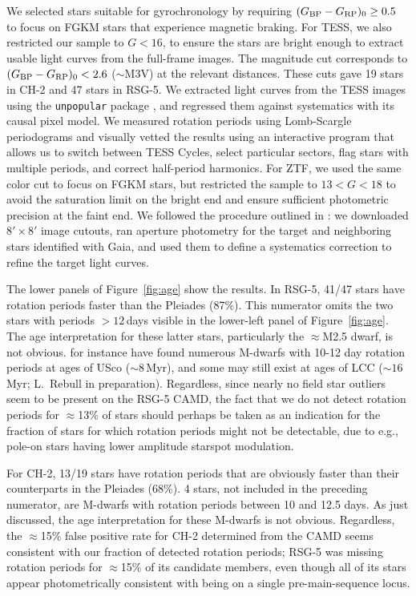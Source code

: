 \documentclass[12pt,twocolumn]{aastex63}
\newcommand{\bpmrpo}{(G_{\rm BP}-G_{\rm RP})_0}
\begin{document}
We selected stars suitable for gyrochronology by requiring $\bpmrpo
\geq 0.5$ to focus on FGKM stars that experience magnetic braking.
For TESS, we also restricted our sample to $G<16$, to ensure the stars
are bright enough to extract usable light curves from the full-frame
images.  The magnitude cut corresponds to $\bpmrpo < 2.6$
($\sim$M3V) at the relevant distances.  These cuts gave 19 stars in
CH-2 and 47 stars in RSG-5.  We extracted light curves from the TESS
images using the \texttt{unpopular} package \citep{hattorio_2021_cpm},
and regressed them against systematics with its causal pixel model.
We measured rotation periods using Lomb-Scargle periodograms and
visually vetted the results using an interactive program that allows
us to switch between TESS Cycles, select particular sectors, flag
stars with multiple periods, and correct half-period harmonics. For
ZTF, we used the same color cut to focus on FGKM stars, but restricted
the sample to $13 < G < 18$ to avoid the saturation limit on the
bright end and ensure sufficient photometric precision at the faint
end. We followed the procedure outlined in \citet{curtis_rup147_2020}:
we downloaded $8'\times8'$ image cutouts, ran aperture photometry for
the target and neighboring stars identified with Gaia, and used them
to define a systematics correction to refine the target light curves. 

The lower panels of Figure~\ref{fig:age} show the results.  In RSG-5,
41/47 stars have rotation periods faster than the Pleiades (87\%).
This numerator omits the two stars with periods $>$$12$\,days visible
in the lower-left panel of Figure~\ref{fig:age}.  The age
interpretation for these latter stars, particularly the $\approx$M2.5
dwarf, is not obvious.  \citet{rebull_usco_2018} for instance have
found numerous M-dwarfs with 10-12 day rotation periods at ages of
USco ($\sim$$8$\,Myr), and some may still exist at ages of LCC
($\sim$$16$\,Myr; L.~Rebull in preparation).  Regardless, since
nearly no field star outliers seem to be present on the RSG-5 CAMD,
the fact that we do not detect rotation periods for $\approx$13\% of
stars should perhaps be taken as an indication for the fraction of
stars for which rotation periods might not be detectable, due to
{e.g.}, pole-on stars having lower amplitude starspot modulation.

For CH-2, 13/19 stars have rotation periods that are obviously faster
than their counterparts in the Pleiades (68\%).  4 stars, not included
in the preceding numerator, are M-dwarfs with rotation periods between
10 and 12.5 days.  As just discussed, the age interpretation for these
M-dwarfs is not obvious.  Regardless, the $\approx$15\% false positive
rate for CH-2 determined from the CAMD seems consistent with our
fraction of detected rotation periods; RSG-5 was missing rotation
periods for $\approx$15\% of its candidate members, even though all of
its stars appear photometrically consistent with being on a single
pre-main-sequence locus.
\end{document}
